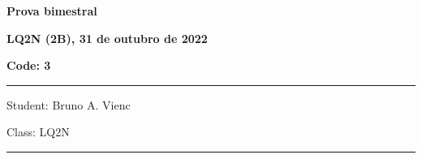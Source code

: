 \documentclass[12pt, addpoints]{exam}
\begin{document}
    \begin{minipage}[b]{0.75\linewidth}
        \begin{flushleft}
            {\bf \large Prova bimestral}
        \end{flushleft}
        \begin{flushleft}
            {\bf \large LQ2N (2B), 31 de outubro de 2022}
        \end{flushleft}
    \end{minipage}
    \begin{minipage}[b]{0.20\linewidth}
        \begin{flushright}
            {\bf \large Code: 3}
        \end{flushright}
    \end{minipage}
    \vspace{0.5cm} \hrule \vspace{0.5cm}
    \begin{minipage}{0.75\linewidth}
        \begin{flushleft}
            Student: Bruno A. Vienc
        \end{flushleft}
    \end{minipage}
    \begin{minipage}{0.20\linewidth}
        \begin{flushright}
            Class: LQ2N
        \end{flushright}
    \end{minipage}
    \vspace{0.5cm} \hrule \vspace{0.5cm}
\end{document}
